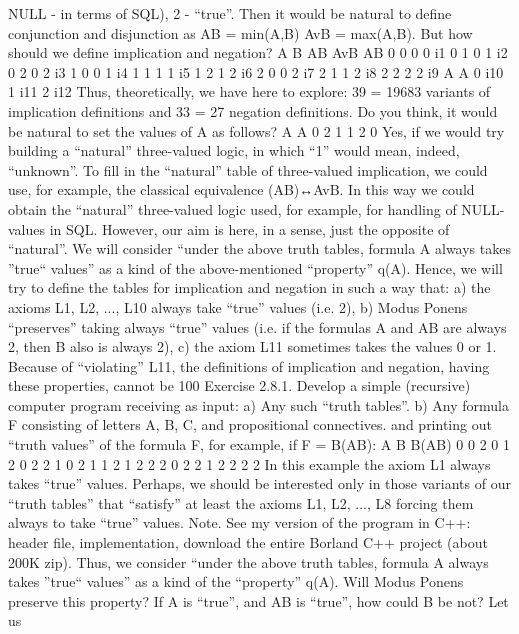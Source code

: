 NULL - in terms of SQL), 2 - ``true''. Then it would be natural to define conjunction and disjunction as
A\AND B = min(A,B)
AvB = max(A,B).
But how should we define implication and negation?
A B A\AND B AvB A\IMPLIES B
0 0 0 0 i1
0 1 0 1 i2
0 2 0 2 i3
1 0 0 1 i4
1 1 1 1 i5
1 2 1 2 i6
2 0 0 2 i7
2 1 1 2 i8
2 2 2 2 i9
A \neg A
0 i10
1 i11
2 i12
Thus, theoretically, we have here to explore: 39 = 19683 variants of implication definitions and 33 = 27
negation definitions.
Do you think, it would be natural to set the values of \neg A as follows?
A \neg A
0 2
1 1
2 0
Yes, if we would try building a ``natural'' three-valued logic, in which ``1'' would mean, indeed,
``unknown''. To fill in the “natural” table of three-valued implication, we could use, for example, the
classical equivalence (A\IMPLIES B)↔\neg AvB. In this way we could obtain the “natural” three-valued logic used,
for example, for handling of NULL-values in SQL.
However, our aim is here, in a sense, just the opposite of “natural”. We will consider
``under the above truth tables, formula A always takes ''true`` values''
as a kind of the above-mentioned ``property'' q(A). Hence, we will try to define the tables for implication
and negation in such a way that:
a) the axioms L1, L2, ..., L10 always take ``true'' values (i.e. 2),
b) Modus Ponens ``preserves'' taking always ``true'' values (i.e. if the formulas A and A\IMPLIES B are always 2,
then B also is always 2),
c) the axiom L11 sometimes takes the values 0 or 1.
Because of ``violating'' L11, the definitions of implication and negation, having these properties, cannot be
100%
Exercise 2.8.1. Develop a simple (recursive) computer program receiving as input:
a) Any such ``truth tables''.
b) Any formula F consisting of letters A, B, C, and propositional connectives.
and printing out ``truth values'' of the formula F, for example, if F = B\IMPLIES (A\IMPLIES B):
A B B\IMPLIES (A\IMPLIES B)
0 0 2
0 1 2
0 2 2
1 0 2
1 1 2
1 2 2
2 0 2
2 1 2
2 2 2
In this example the axiom L1 always takes ``true'' values. Perhaps, we should be interested only in those
variants of our ``truth tables'' that ``satisfy'' at least the axioms L1, L2, ..., L8 forcing them always to take
``true'' values.
Note. See my version of the program in C++: header file, implementation, download the entire Borland C++ project (about
200K zip).
Thus, we consider
``under the above truth tables, formula A always takes ''true`` values''
as a kind of the ``property'' q(A).
Will Modus Ponens preserve this property? If A is ``true'', and A\IMPLIES B is ``true'', how could B be not? Let us
